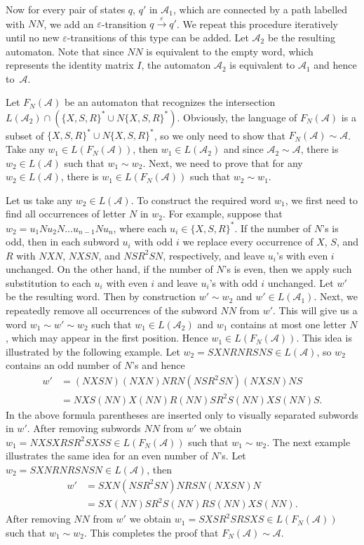 \documentclass[fontsize=11pt,DIV=13,paper=letter]{scrartcl}
\theoremstyle{definition}
\newcommand{\A}{\mathcal{A}}
\renewcommand{\epsilon}{\varepsilon}
\begin{document}
Now for every pair of states $q$, $q'$ in $\A_1$, which are connected by a path labelled with $\mathit{NN}$, we add an $\epsilon$-transition $q\xrightarrow{\epsilon} q'$. We repeat this procedure iteratively until no new $\epsilon$-transitions of this type can be added. Let $\A_2$ be the resulting automaton. Note that since $\mathit{NN}$ is equivalent to the empty word, which represents the identity matrix $I$, the automaton $\A_2$ is equivalent to $\A_1$ and hence to~$\A$.

Let $F_N(\A)$ be an automaton that recognizes the intersection $L(\A_2)\cap ({\{X,S,R\}}^*\cup N{\{X,S,R\}}^*)$. Obviously, the language of $F_N(\A)$ is a subset of ${\{X,S,R\}}^*\cup N{\{X,S,R\}}^*$, so we only need to show that $F_N(\A)\sim \A$. Take any $w_1\in L(F_N(\A))$, then $w_1\in L(\A_2)$ and since $\A_2\sim \A$, there is $w_2\in L(\A)$ such that $w_1\sim w_2$. Next, we need to prove that for any $w_2\in L(\A)$, there is $w_1\in L(F_N(\A))$ such that $w_2\sim w_1$.

Let us take any $w_2\in L(\A)$. To construct the required word $w_1$, we first need to find all occurrences of letter $N$ in $w_2$. For example, suppose that $w_2=u_1Nu_2N\dots u_{n-1}Nu_n$, where each $u_i\in {\{X,S,R\}}^*$. If the number of $N$'s is odd, then in each subword $u_i$ with odd $i$ we replace every occurrence of $X$, $S$, and $R$ with $\mathit{NXN}$, $\mathit{NXSN}$, and $\mathit{NS}R^2\mathit{SN}$, respectively, and leave $u_i$'s with even $i$ unchanged. On the other hand, if the number of $N$'s is even, then we apply such substitution to each $u_i$ with even $i$ and leave $u_i$'s with odd $i$ unchanged. Let $w'$ be the resulting word. Then by construction $w'\sim w_2$ and $w'\in L(\A_1)$. Next, we repeatedly remove all occurrences of the subword $\mathit{NN}$ from $w'$. This will give us a word $w_1\sim w'\sim w_2$ such that $w_1\in L(\A_2)$ and $w_1$ contains at most one letter $N$, which may appear in the first position. Hence $w_1\in L(F_N(\A))$. This idea is illustrated by the following example. Let $w_2=\mathit{SXNRNRSNS}\in L(\A)$, so $w_2$ contains an odd number of $N$'s and hence
\[
\begin{split}
w'&=(\mathit{NXSN})(\mathit{NXN})\mathit{NRN}(\mathit{NS}R^2\mathit{SN})(\mathit{NXSN})\mathit{NS}\\
&=\mathit{NXS}(\mathit{NN})X(\mathit{NN})R(\mathit{NN})SR^2S(\mathit{NN})\mathit{XS}(\mathit{NN})S.
\end{split}
\]
In the above formula parentheses are inserted only to visually separated subwords in $w'$. After removing subwords $\mathit{NN}$ from $w'$ we obtain $w_1=\mathit{NXSXRS}R^2\mathit{SXSS}\in L(F_N(\A))$ such that $w_1\sim w_2$.
The next example illustrates the same idea for an even number of $N$'s. Let $w_2=\mathit{SXNRNRSNSN}\in L(\A)$, then
\[
\begin{split}
w'&=\mathit{SXN}(\mathit{NS}R^2\mathit{SN})\mathit{NRSN}(\mathit{NXSN})N\\
&=\mathit{SX}(\mathit{NN})SR^2S(\mathit{NN})\mathit{RS}(\mathit{NN})\mathit{XS}(\mathit{NN}).
\end{split}
\]
After removing $\mathit{NN}$ from $w'$ we obtain $w_1=\mathit{SXS}R^2\mathit{SRSXS}\in L(F_N(\A))$ such that $w_1\sim w_2$. This completes the proof that $F_N(\A)\sim \A$.
\end{document}
